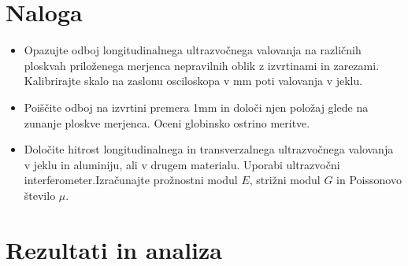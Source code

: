 \documentclass[10pt]{article}
\begin{document}
\section{Naloga}

\begin{itemize}
    \item Opazujte odboj longitudinalnega ultrazvočnega valovanja na različnih ploskvah priloženega merjenca nepravilnih oblik z izvrtinami in zarezami. Kalibrirajte skalo na zaslonu osciloskopa v mm poti valovanja v jeklu.
    \item Poiščite odboj na izvrtini premera 1mm in določi njen položaj glede na zunanje ploskve merjenca. Oceni globinsko ostrino meritve.
    \item Določite hitrost longitudinalnega in transverzalnega ultrazvočnega valovanja v jeklu in aluminiju, ali v drugem materialu. Uporabi ultrazvočni interferometer.Izračunajte prožnostni modul $E$, strižni modul $G$ in Poissonovo število $\mu$.
\end{itemize}

\section{Rezultati in analiza}
\end{document}
